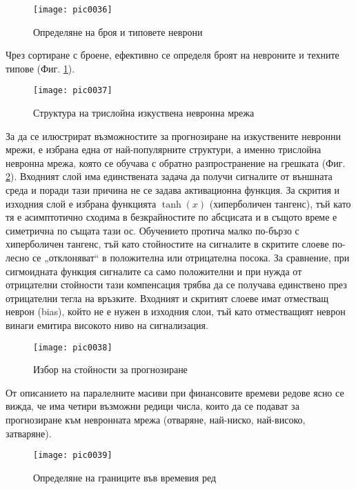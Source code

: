 \begin{figure}[h]
  \centering
  \texttt{[image: pic0036]}
  \caption{Определяне на броя и типовете неврони}
\label{fig:pic0036}
\end{figure}
\FloatBarrier

Чрез сортиране с броене, ефективно се определя броят на невроните и техните типове (Фиг. \ref{fig:pic0036}).

\begin{figure}[h]
  \centering
  \texttt{[image: pic0037]}
  \caption{Структура на трислойна изкуствена невронна мрежа}
\label{fig:pic0037}
\end{figure}
\FloatBarrier

За да се илюстрират възможностите за прогнозиране на изкуствените невронни мрежи, е избрана една от най-популярните структури, а именно трислойна невронна мрежа, която се обучава с обратно разпространение на грешката (Фиг. \ref{fig:pic0037}). Входният слой има единствената задача да получи сигналите от външната среда и поради тази причина не се задава активационна функция. За скрития и изходния слой е избрана функцията $\tanh( x )$ (хиперболичен тангенс), тъй като тя е асимптотично сходима в безкрайностите по абсцисата и в същото време е симетрична по същата тази ос. Обучението протича малко по-бързо с хиперболичен тангенс, тъй като стойностите на сигналите в скритите слоеве по-лесно се „отклоняват“ в положителна или отрицателна посока. За сравнение, при сигмоидната функция сигналите са само положителни и при нужда от отрицателни стойности тази компенсация трябва да се получава единствено през отрицателни тегла на връзките. Входният и скритият слоеве имат отместващ неврон (bias), който не е нужен в изходния слои, тъй като отместващият неврон винаги емитира високото ниво на сигнализация.

\begin{figure}[h]
  \centering
  \texttt{[image: pic0038]}
  \caption{Избор на стойности за прогнозиране}
\label{fig:pic0038}
\end{figure}
\FloatBarrier

От описанието на паралелните масиви при финансовите времеви редове ясно се вижда, че има четири възможни редици числа, които да се подават за прогнозиране към невронната мрежа (отваряне, най-ниско, най-високо, затваряне). 

\begin{figure}[h]
  \centering
  \texttt{[image: pic0039]}
  \caption{Определяне на границите във времевия ред}
\label{fig:pic0039}
\end{figure}
\FloatBarrier

